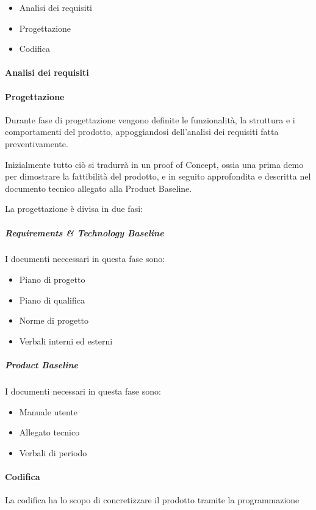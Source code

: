 \documentclass[12pt]{article}
\begin{document}
\begin{itemize}
    \item Analisi dei requisiti
    \item Progettazione
    \item Codifica
\end{itemize}

\paragraph{Analisi dei requisiti}

\paragraph{Progettazione}
Durante fase di progettazione vengono definite le funzionalità, la struttura e i comportamenti del prodotto, appoggiandosi dell'analisi dei requisiti fatta preventivamente.

Inizialmente tutto ciò si tradurrà in un proof of Concept, ossia una prima demo per dimostrare la fattibilità del prodotto, e in seguito approfondita e descritta nel documento tecnico allegato alla Product Baseline.

La progettazione è divisa in due fasi:

\subparagraph{Requirements \& Technology Baseline}
I documenti neccessari in questa fase sono:
\begin{itemize}
    \item Piano di progetto
    \item Piano di qualifica
    \item Norme di progetto
    \item Verbali interni ed esterni
\end{itemize}

\subparagraph{Product Baseline}
I documenti necessari in questa fase sono:
\begin{itemize}
    \item Manuale utente
    \item Allegato tecnico
    \item Verbali di periodo
\end{itemize}

\paragraph{Codifica}
La codifica ha lo scopo di concretizzare il prodotto tramite la programmazione
\end{document}
